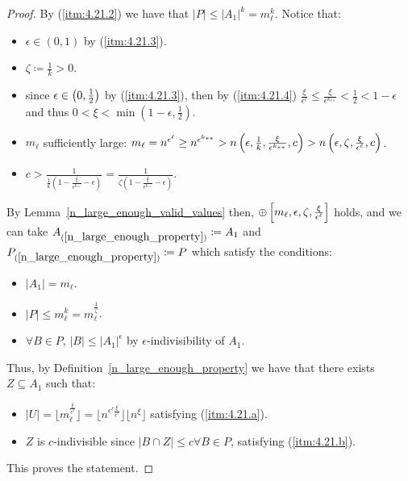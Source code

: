 \begin{lemma}[Claim 4.21]
\begin{proof}
            By (\ref{itm:4.21.2}) we have that $|P| \leq |A_1|^k = m_\ell^k$.
            Notice that:
            \begin{itemize}
                \item $\epsilon \in (0,1)$ by (\ref{itm:4.21.3}).
                \item $\zeta \coloneqq \frac{1}{k} > 0$.
                \item since $\epsilon \in \left( 0, \frac{1}{2} \right)$ by (\ref{itm:4.21.3}), then by (\ref{itm:4.21.4})
                    $\frac{\xi}{\epsilon^\ell} \leq \frac{\xi}{\epsilon^{k_{**}}} < \frac{1}{2} < 1 - \epsilon$ and
                    thus $0 < \xi < \min(1-\epsilon, \frac{1}{2})$.
                \item $m_\ell$ sufficiently large: $m_\ell = n^{\epsilon^\ell} \geq n^{\epsilon^{k_{**}}} > n\left( \epsilon, \frac{1}{k},
                    \frac{\xi}{\epsilon^{k_{**}}}, c \right) > n\left( \epsilon, \zeta, \frac{\xi}{\epsilon^{\ell}}, c \right)$.
                \item $c > \frac{1}{\frac{1}{k} (1 - \frac{\xi}{\epsilon^{k_{**}}} - \epsilon)}
                    = \frac{1}{\zeta (1 - \frac{\xi}{\epsilon^{k_{**}}} - \epsilon)}$.
            \end{itemize}
            By Lemma~\ref{n_large_enough_valid_values} then, $\oplus\left[ m_\ell, \epsilon, \zeta, \frac{\xi}{\epsilon^\ell} \right]$
            holds, and we can take $A_{(\ref{n_large_enough_property})} \coloneqq A_1$ and
            $P_{(\ref{n_large_enough_property})} \coloneqq P$ which satisfy the conditions:
            \begin{itemize}
                \item $|A_1| = m_\ell$.
                \item $|P| \leq m_\ell^k = m_\ell^{\frac{1}{\zeta}}$.
                \item $\forall B \in P$, $|B| \leq |A_1|^\epsilon$ by $\epsilon$-indivisibility of $A_1$.
            \end{itemize}
            Thus, by Definition~\ref{n_large_enough_property} we have that there exists $Z \subseteq A_1$ such that:
            \begin{itemize}
                \item $|U| = \lfloor m_\ell^{\frac{\xi}{\epsilon^\ell}} \rfloor = \lfloor n^{\epsilon^\ell \frac{\xi}{\epsilon^\ell}} \rfloor
                    \lfloor n^\xi \rfloor$ satisfying (\ref{itm:4.21.a}).
                \item $Z$ is $c$-indivisible since $|B \cap Z| \leq c \forall B \in P$, satisfying (\ref{itm:4.21.b}).
            \end{itemize}
            This proves the statement.
        \end{proof}
    \end{lemma}


